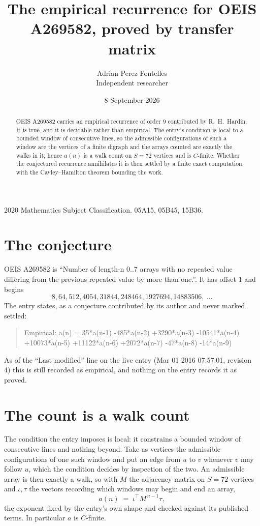 \documentclass[11pt,a4paper]{article}
\title{The empirical recurrence for OEIS A269582, proved by transfer matrix}
\author{Adrian Perez Fontelles\\ \small Independent researcher}
\date{8 September 2026}
\theoremstyle{plain}
\theoremstyle{definition}
\begin{document}
\maketitle

\begin{abstract}
OEIS A269582 carries an empirical recurrence of order $9$ contributed by R.~H.~Hardin. It is
true, and it is decidable rather than empirical. The entry's condition is local to a bounded window of consecutive lines, so
the admissible configurations of such a window are the vertices of a finite digraph and the
arrays counted are exactly the walks in it; hence $a(n)$ is a walk count on $S=72$ vertices
and is $C$-finite. Whether the conjectured recurrence annihilates it is then settled by a
finite exact computation, with the Cayley--Hamilton theorem bounding the work.
\end{abstract}

\noindent\small 2020 Mathematics Subject Classification. 05A15, 05B45, 15B36.\normalsize

\section{The conjecture}

OEIS A269582 is ``Number of length-n 0..7 arrays with no repeated value differing from the previous repeated value by more than one.''. It has offset $1$ and begins
\[
8, 64, 512, 4054, 31844, 248464, 1927694, 14883506,\ \dots
\]
The entry states, as a conjecture contributed by its author and never marked settled:
\begin{quote}
Empirical: a(n) = 35*a(n-1) -485*a(n-2) +3290*a(n-3) -10541*a(n-4) +10073*a(n-5) +11122*a(n-6) +2072*a(n-7) -47*a(n-8) -14*a(n-9)
\end{quote}
As of the ``Last modified'' line on the live entry (Mar 01 2016 07:57:01, revision 4) this is still
recorded as empirical, and nothing on the entry records it as proved.

\section{The count is a walk count}

The condition the entry imposes is local: it constrains a bounded window of consecutive lines and nothing beyond. Take as
vertices the admissible configurations of one such window and put an edge from $u$ to $v$
whenever $v$ may follow $u$, which the condition decides by inspection of the two. An
admissible array is then exactly a walk, so with $M$ the adjacency matrix on $S=72$ vertices
and $\iota,\tau$ the vectors recording which windows may begin and end an array,
\[
a(n)\;=\;\iota^{\!\top}M^{\,n-1}\tau ,
\]
the exponent fixed by the entry's own shape and checked against its published terms. In
particular $a$ is $C$-finite.
\end{document}
